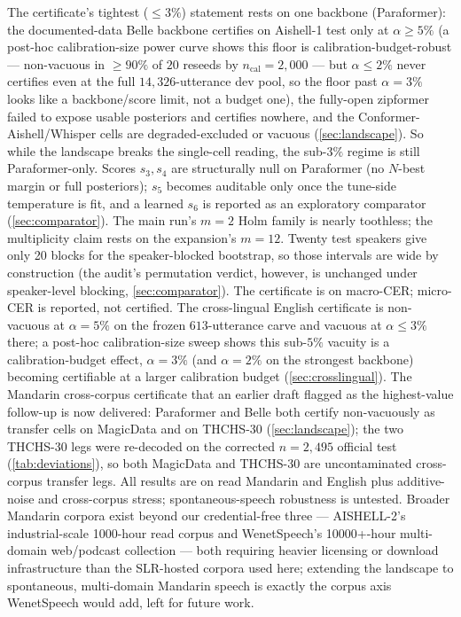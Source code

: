 \documentclass[11pt]{article}
\begin{document}
The certificate's tightest ($\le3\%$) statement rests on one backbone (Paraformer): the
documented-data Belle backbone certifies on Aishell-1 test only at $\alpha\ge5\%$ (a
post-hoc calibration-size power curve shows this floor is calibration-budget-robust ---
non-vacuous in $\ge90\%$ of $20$ reseeds by $n_{\mathrm{cal}}{=}2{,}000$ --- but
$\alpha\le2\%$ never certifies even at the full $14{,}326$-utterance dev pool, so the
floor past $\alpha{=}3\%$ looks like a backbone/score limit, not a budget one), the
fully-open zipformer failed to expose usable posteriors and certifies nowhere, and the
Conformer-Aishell/Whisper cells are degraded-excluded or vacuous (\cref{sec:landscape}).
So while the landscape breaks the single-cell reading, the sub-$3\%$ regime is still
Paraformer-only. Scores $s_3,s_4$ are structurally null on Paraformer (no $N$-best margin or
full posteriors); $s_5$ becomes auditable only once the tune-side temperature is fit, and
a learned $s_6$ is reported as an exploratory comparator (\cref{sec:comparator}). The main
run's $m=2$ Holm family is nearly toothless; the multiplicity claim rests on the
expansion's $m=12$. Twenty test speakers give only 20 blocks for the speaker-blocked
bootstrap, so those intervals are wide by construction (the audit's permutation verdict,
however, is unchanged under speaker-level blocking, \cref{sec:comparator}). The certificate
is on macro-CER; micro-CER is reported, not certified. The cross-lingual English certificate
is non-vacuous at $\alpha=5\%$ on the frozen $613$-utterance carve and vacuous at
$\alpha\le3\%$ there; a post-hoc calibration-size sweep shows this sub-$5\%$ vacuity is a
calibration-budget effect, $\alpha=3\%$ (and $\alpha=2\%$ on the strongest backbone) becoming
certifiable at a larger calibration budget (\cref{sec:crosslingual}). The Mandarin
cross-corpus certificate that an earlier draft flagged as the highest-value follow-up is now
delivered: Paraformer and Belle both certify non-vacuously as transfer cells on MagicData and
on THCHS-30 (\cref{sec:landscape}); the two THCHS-30 legs were re-decoded on the corrected
$n{=}2{,}495$ official test (\cref{tab:deviations}), so both MagicData and THCHS-30 are
uncontaminated cross-corpus transfer legs. All results are on read Mandarin and
English plus additive-noise and cross-corpus stress; spontaneous-speech robustness is
untested. Broader Mandarin corpora exist beyond our credential-free three --- AISHELL-2's
industrial-scale 1000-hour read corpus \citep{du2018aishell2} and WenetSpeech's
10000+-hour multi-domain web/podcast collection \citep{zhang2022wenetspeech} --- both
requiring heavier licensing or download infrastructure than the SLR-hosted corpora used
here; extending the landscape to spontaneous, multi-domain Mandarin speech is exactly the
corpus axis WenetSpeech would add, left for future work.
\end{document}
